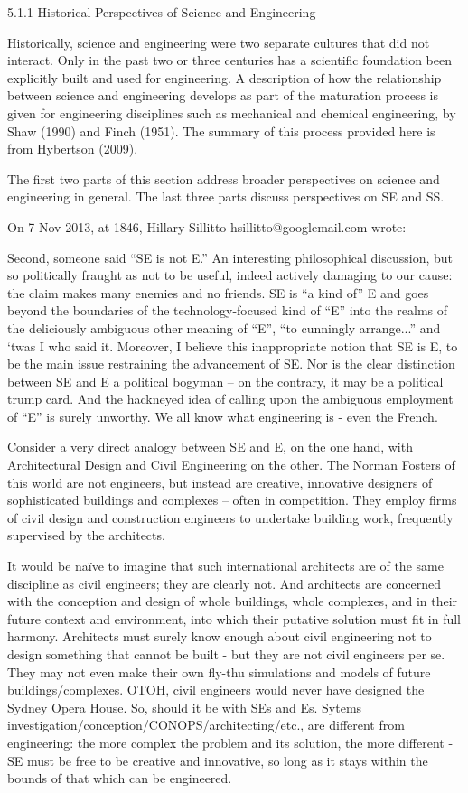 5.1.1 Historical Perspectives of Science and Engineering

Historically, science and engineering were two separate cultures that did not interact. Only in the past two or three centuries has a scientific foundation been explicitly built and used for engineering. A description of how the relationship between science and engineering develops as part of the maturation process is given for engineering disciplines such as mechanical and chemical engineering, by Shaw (1990) and Finch (1951). The summary of this process provided here is from Hybertson (2009).

The first two parts of this section address broader perspectives on science and engineering in general. The last three parts discuss perspectives on SE and SS.

On 7 Nov 2013, at 1846, Hillary Sillitto hsillitto@googlemail.com wrote:

Second, someone said ``SE is not E.''  An interesting philosophical discussion, but so politically fraught as not to be useful, indeed actively damaging to our cause: the claim makes many enemies and no friends. SE is ``a kind of'' E and goes beyond the boundaries of the technology-focused kind of “E” into the realms of the deliciously ambiguous other meaning of ``E'', ``to cunningly arrange...'' and ‘twas I who said it. Moreover, I believe this inappropriate notion that SE is E, to be the main issue restraining the advancement of SE. Nor is the clear distinction between SE and E a political bogyman – on the contrary, it may be a political trump card. And the hackneyed idea of calling upon the ambiguous employment of “E” is surely unworthy. We all know what engineering is - even the French.

Consider a very direct analogy between SE and E, on the one hand, with Architectural Design and Civil Engineering on the other. The Norman Fosters of this world are not engineers, but instead are creative, innovative designers of sophisticated buildings and complexes – often in competition. They employ firms of civil design and construction engineers to undertake building work, frequently supervised by the architects.

It would be naïve to imagine that such international architects are of the same discipline as civil engineers; they are clearly not. And architects are concerned with the conception and design of whole buildings, whole complexes, and in their future context and environment, into which their putative solution must fit in full harmony. Architects must surely know enough about civil engineering not to design something that cannot be built - but they are not civil engineers per se. They may not even make their own fly-thu simulations and models of future buildings/complexes. OTOH, civil engineers would never have designed the Sydney Opera House. So, should it be with SEs and Es. Sytems investigation/conception/CONOPS/architecting/etc., are different from engineering: the more complex the problem and its solution, the more different - SE must be free to be creative and innovative, so long as it stays within the bounds of that which can be engineered.

